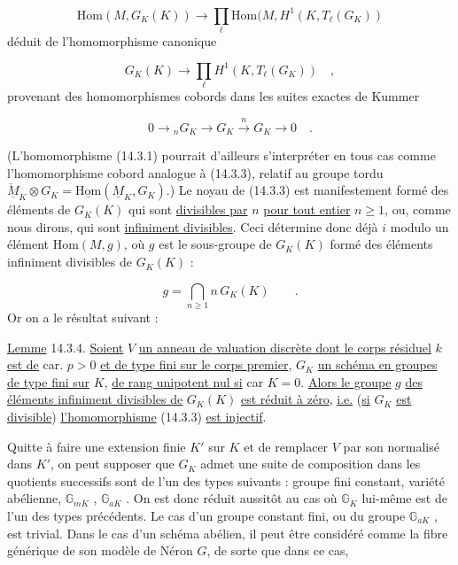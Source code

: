 \begin{equation}\tag{14.3.2}
\mathrm{Hom}(M, G_K(K)) \longrightarrow \prod_\ell \mathrm{Hom}(M, H^1(K, T_\ell(G_K))
\end{equation}
déduit de l'homomorphisme canonique

\begin{equation}\tag{14.3.3}
G_K(K) \longrightarrow \prod_\ell H^1(K, T_\ell(G_K)) \quad ,
\end{equation}
provenant des homomorphismes cobords dans les suites exactes de Kummer

\begin{equation*}
0 \longrightarrow {}_n G_K \longrightarrow G_K \xrightarrow{\; n \;} G_K \longrightarrow 0 \quad .
\end{equation*}


(L'homomorphisme (14.3.1) pourrait d'ailleurs s'interpréter en tous cas comme l'homomorphisme cobord analogue à (14.3.3), relatif au groupe tordu $\check{\underline{M}}_K \otimes G_K = \underline{\mathrm{Hom}}(\underline{M}_K , G_K)$.) Le noyau de (14.3.3) est manifestement formé des éléments de $G_K(K)$ qui sont \underline{divisibles par} $n$ \underline{pour tout entier} $n \geq 1$, ou, comme nous dirons, qui sont \underline{infiniment divisibles}. Ceci détermine donc déjà $i$ modulo un élément $\mathrm{Hom}(M,g)$, où $g$ est le sous-groupe de $G_K(K)$ formé des éléments infiniment divisibles de $G_K(K)$ :

\begin{equation*}
g = \bigcap_{n \geq 1} n\, G_K(K) \qquad .
\end{equation*}
Or on a le résultat suivant :

\underline{Lemme} 14.3.4. \underline{Soient} $V$ \underline{un anneau de valuation discrète dont le corps résiduel} $k$ \underline{est de} car. $p > 0$ \underline{et de type fini sur le corps premier}, $G_K$ \underline{un schéma en groupes de type fini sur} $K$, \underline{de rang unipotent nul si} car $K = 0$. \underline{Alors le groupe} $g$ \underline{des éléments infiniment divisibles de} $G_K(K)$ \underline{est réduit à zéro}, \underline{i.e.} (\underline{si} $G_K$ \underline{est divisible}) \underline{l'homomorphisme} (14.3.3) \underline{est injectif}.

Quitte à faire une extension finie $K'$ sur $K$ et de remplacer $V$ par son normalisé dans $K'$, on peut supposer que $G_K$ admet une suite de composition dans les quotients successifs sont de l'un des types suivants : groupe fini constant, variété abélienne, $\mathbb{G}_{mK}$ , $\mathbb{G}_{aK}$ . On est donc réduit aussitôt au cas où $\mathbb{G}_K$ lui-même est de l'un des types précédents. Le cas d'un groupe constant fini, ou du groupe $\mathbb{G}_{aK}$ , est trivial. Dans le cas d'un schéma abélien, il peut être considéré comme la fibre générique de son modèle de Néron $G$, de sorte que dans ce cas,


